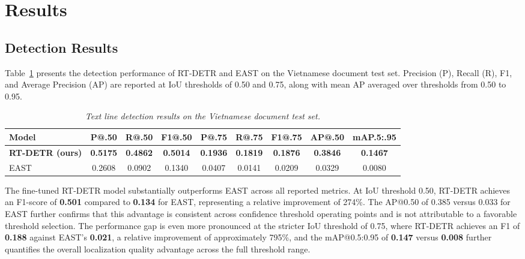 \section{Results}
\subsection{Detection Results}

Table~\ref{tab:detection_results} presents the detection performance of RT-DETR and EAST on the Vietnamese document test set. Precision (P), Recall (R), F1, and Average Precision (AP) are reported at IoU thresholds of 0.50 and 0.75, along with mean AP averaged over thresholds from 0.50 to 0.95.

\begin{table}[ht]
\centering
\scriptsize
\caption[Text line detection results on the Vietnamese document test set]{\textit{Text line detection results on the Vietnamese document test set.}}
\label{tab:detection_results}
\begin{tabular}{lcccccccc}
\hline
\textbf{Model} & \textbf{P@.50} & \textbf{R@.50} & \textbf{F1@.50} & \textbf{P@.75} & \textbf{R@.75} & \textbf{F1@.75} & \textbf{AP@.50} & \textbf{mAP.5:.95} \\
\hline
\textbf{RT-DETR (ours)} & \textbf{0.5175} & \textbf{0.4862} & \textbf{0.5014} & \textbf{0.1936} & \textbf{0.1819} & \textbf{0.1876} & \textbf{0.3846} & \textbf{0.1467} \\
EAST & 0.2608 & 0.0902 & 0.1340 & 0.0407 & 0.0141 & 0.0209 & 0.0329 & 0.0080 \\
\hline
\end{tabular}
\end{table}

The fine-tuned RT-DETR model substantially outperforms EAST across all reported metrics. At IoU threshold 0.50, RT-DETR achieves an F1-score of \textbf{0.501} compared to \textbf{0.134} for EAST, representing a relative improvement of 274\%. The AP@0.50 of 0.385 versus 0.033 for EAST further confirms that this advantage is consistent across confidence threshold operating points and is not attributable to a favorable threshold selection. The performance gap is even more pronounced at the stricter IoU threshold of 0.75, where RT-DETR achieves an F1 of \textbf{0.188} against EAST's \textbf{0.021}, a relative improvement of approximately 795\%, and the mAP@0.5:0.95 of \textbf{0.147} versus \textbf{0.008} further quantifies the overall localization quality advantage across the full threshold range.

